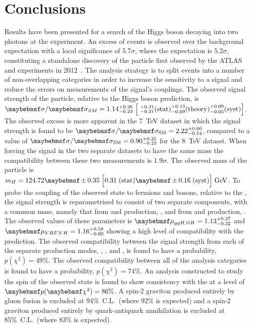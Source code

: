 \chapter{Conclusions}
\label{chap:conclusions}

Results have been presented for a search of the \SM Higgs boson decaying into two photons at the \CMS experiment. An excess of events is observed over the background expectation with a local significance of $5.7\sigma$, where the \SM expectation is $5.2\sigma$, constituting a standalone discovery of the particle first observed by the ATLAS and \CMS experiments in 2012~\cite{ATLASDiscovery,CMSDiscovery}. The analysis strategy is to split events into a number of non-overlapping categories in order to increase the sensitivity to a signal and reduce the errors on measurements of the signal's couplings. The observed signal strength of the particle, relative to the \SM Higgs boson prediction, is $\sigma/\sigma_{SM} = 1.14^{+0.26}_{-0.23} \;\Bigl[\;^{+0.21}_{-0.21} \mathrm{(stat)} ^{+0.13}_{-0.09} \mathrm{(theory)} ^{+0.09}_{-0.05} \mathrm{(syst)} \Bigr]$. The observed excess is more apparent in the 7~TeV dataset in which the signal strength is found to be $\musm=2.22^{+0.60}_{-0.54}$, compared to a value of $\musm=0.90^{+0.25}_{-0.23}$ for the 8~TeV dataset. When forcing the signal in the two separate datasets to have the same mass the compatibility between these two measurements is $1.9\sigma$. The observed mass of the particle is $m_{H} = 124.72 \pm 0.35 \; \Bigl[ 0.31 \mathrm{\;(stat)} \pm 0.16 \mathrm{\;(syst)} \Bigr] \mathrm{\;GeV}$. To probe the coupling of the observed state to fermions and bosons, relative to the \SM, the signal strength is reparametrised to consist of two separate components, with a common mass, namely that from \ggH and \ttH production, \RF, and from \VBF and \VH production, \RV. The observed values of these parameters is $\RF=1.13^{+0.37}_{-0.32}$ and $\RV=1.16^{+0.58}_{-0.60}$ showing a high level of compatibility with the \SM prediction. The observed compatibility between the signal strength from each of the separate production modes, \ggH, \VBF, \VH and \ttH, is found to have a probability, $p(\chi^{2})=49\%$. The observed compatibility between all of the analysis categories is found to have a probability, $p(\chi^{2})=74\%$. An analysis constructed to study the spin of the observed state is found to show consistency with the \SM at a level of $\p(\chi^{2})=86\%$. A spin-2 graviton produced entirely by gluon fusion is excluded at 94\%~C.L.~(where 92\% is expected) and a spin-2 graviton produced entirely by quark-antiquark annihilation is excluded at 85\%~C.L.~(where 83\% is expected).

